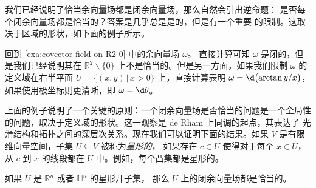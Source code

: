 我们已经说明了恰当余向量场都是闭余向量场，那么自然会引出逆命题：
是否每个闭余向量场都是恰当的？答案是几乎总是是的，但是有一个重要
的限制。这取决于区域的形状，如下面的例子所示。

\begin{example}
  回到 \autoref{exa:covector field on R2-0} 中的余向量场 $\omega$。
  直接计算可知 $\omega$ 是闭的，但是我们已经说明其在 $\mathbb{R}^2 \smallsetminus\{0\}$
  上不是恰当的。但是另一方面，如果我们限制 $\omega$ 的定义域在右半平面
  $U=\{(x,y)\,|\, x>0\}$ 上，直接计算表明 $\omega=\d\bigl(\arctan y/x\bigr)$，
  如果使用极坐标则更清晰，即 $\omega=\d\theta$。
\end{example}

上面的例子说明了一个关键的原则：一个闭余向量场是否恰当的问题是一个全局性
的问题，取决于定义域的形状。这一观察是 de Rham 上同调的起点，其表达了
光滑结构和拓扑之间的深层次关系。现在我们可以证明下面的结果。如果
$V$ 是有限维向量空间，子集 $U\subseteq V$ 被称为\emph{星形的}，
如果存在 $c\in U$ 使得对于每个 $x\in U$，从 $c$ 到 $x$ 的线段都在
$U$ 中。例如，每个凸集都是星形的。

\begin{theorem}
  如果 $U$ 是 $\mathbb{R}^n$ 或者 $\mathbb{H}^n$ 的星形开子集，
  那么 $U$ 上的闭余向量场都是恰当的。
\end{theorem}

